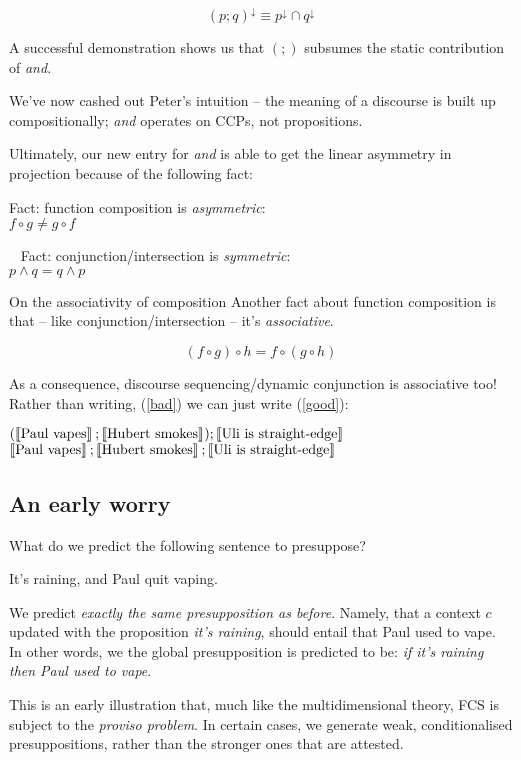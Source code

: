 \documentclass[cronos,landscape,paper=letter]{ling-handout}
\begin{document}
{\begin{tcolorbox}
    \[(p;q)^{↓} ≡ p^{↓} ∩ q^{↓}\]

    A successful demonstration shows us that \((;)\) subsumes the static contribution of \textit{and}.
  \end{tcolorbox}

  We've now cashed out Peter's intuition -- the meaning of a discourse is built up compositionally; \textit{and} operates on CCPs, not propositions.

  Ultimately, our new entry for \textit{and} is able to get the linear asymmetry in projection because of the following fact:


  \ex Fact: function composition is \textit{asymmetric}:\\
  \(f∘g ≠ g∘f\)
  \xe

  \ex~ Fact: conjunction/intersection is \textit{symmetric}:\\
  \(p ∧ q = q ∧ p\)
  \xe

  \begin{tcolorbox}
    On the associativity of composition
    \tcblower
    Another fact about function composition is that -- like conjunction/intersection -- it's \textit{associative}.

    \[(f∘g)∘h = f∘(g∘h)\]

    As a consequence, discourse sequencing/dynamic conjunction is associative too! Rather than writing, (\ref{bad}) we can just write (\ref{good}):

    \pex
    \a\label{bad}\((\eval{Paul vapes};\eval{Hubert smokes});\eval{Uli is straight-edge}\)
    \a\label{good}\(\eval{Paul vapes};\eval{Hubert smokes};\eval{Uli is straight-edge}\)
    \xe

  \end{tcolorbox}

  \subsection{An early worry}

  What do we predict the following sentence to presuppose?

  \ex
  It's raining, and Paul quit vaping.
  \xe

  We predict \textit{exactly the same presupposition as before}. Namely, that a context \(c\) updated with the proposition \textit{it's raining}, should entail that Paul used to vape. In other words, we the global presupposition is predicted to be: \textit{if it's raining then Paul used to vape}.

  This is an early illustration that, much like the multidimensional theory, FCS is subject to the \textit{proviso problem}. In certain cases, we generate weak, conditionalised presuppositions, rather than the stronger ones that are attested.

}
\end{document}
